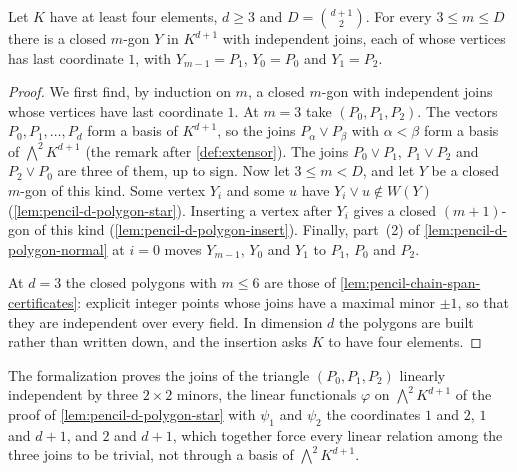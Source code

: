 \begin{lemma}
  \label{lem:pencil-d-polygons}
  \leanok
  Let $K$ have at least four elements, $d \ge 3$ and
  $D = \binom{d+1}{2}$. For every $3 \le m \le D$ there is a closed
  $m$-gon $Y$ in $K^{d+1}$ with independent joins, each of whose
  vertices has last coordinate $1$, with $Y_{m-1} = P_1$, $Y_0 = P_0$ and
  $Y_1 = P_2$.
\end{lemma}
\begin{proof}
  \leanok
  We first find, by induction on $m$, a closed $m$-gon with independent
  joins whose vertices have last coordinate $1$. At $m = 3$ take
  $(P_0, P_1, P_2)$. The vectors $P_0, P_1, \dots, P_d$ form a basis of
  $K^{d+1}$, so the joins $P_\alpha \vee P_\beta$ with $\alpha < \beta$
  form a basis of $\bigwedge^2 K^{d+1}$ (the remark after
  \cref{def:extensor}). The joins $P_0 \vee P_1$, $P_1 \vee P_2$ and
  $P_2 \vee P_0$ are three of them, up to sign. Now let $3 \le m < D$,
  and let $Y$ be a closed $m$-gon of this kind. Some vertex $Y_i$ and
  some $u$ have $Y_i \vee u \notin W(Y)$
  (\cref{lem:pencil-d-polygon-star}). Inserting a vertex after $Y_i$
  gives a closed $(m + 1)$-gon of this kind
  (\cref{lem:pencil-d-polygon-insert}). Finally, part~(2) of
  \cref{lem:pencil-d-polygon-normal} at $i = 0$ moves $Y_{m-1}$, $Y_0$
  and $Y_1$ to $P_1$, $P_0$ and $P_2$.

  At $d = 3$ the closed polygons with $m \le 6$ are those of
  \cref{lem:pencil-chain-span-certificates}: explicit integer points
  whose joins have a maximal minor $\pm 1$, so that they are independent
  over every field. In dimension $d$ the polygons are built rather than
  written down, and the insertion asks $K$ to have four elements.
\end{proof}

\begin{fmlnote}
  The formalization proves the joins of the triangle $(P_0, P_1, P_2)$
  linearly independent by three $2 \times 2$ minors, the linear
  functionals $\varphi$ on $\bigwedge^2 K^{d+1}$ of the proof of
  \cref{lem:pencil-d-polygon-star} with $\psi_1$ and $\psi_2$ the
  coordinates $1$ and $2$, $1$ and $d + 1$, and $2$ and $d + 1$, which
  together force every linear relation among the three joins to be
  trivial, not through a basis of $\bigwedge^2 K^{d+1}$.
\end{fmlnote}

